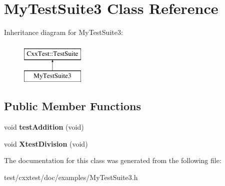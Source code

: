 \hypertarget{classMyTestSuite3}{\section{My\-Test\-Suite3 Class Reference}
\label{classMyTestSuite3}
}
Inheritance diagram for My\-Test\-Suite3\-:\begin{figure}[H]
\begin{center}
\leavevmode
\includegraphics[height=2.000000cm]{classMyTestSuite3}
\end{center}
\end{figure}
\subsection*{Public Member Functions}
\begin{DoxyCompactItemize}
\item 
\hypertarget{classMyTestSuite3_a4090c99d722d07dbd79c3895267669d1}{void {\bfseries test\-Addition} (void)}\label{classMyTestSuite3_a4090c99d722d07dbd79c3895267669d1}

\item 
\hypertarget{classMyTestSuite3_a0954e8a69bcd2aa069be988554eedf89}{void {\bfseries Xtest\-Division} (void)}\label{classMyTestSuite3_a0954e8a69bcd2aa069be988554eedf89}

\end{DoxyCompactItemize}


The documentation for this class was generated from the following file\-:\begin{DoxyCompactItemize}
\item 
test/cxxtest/doc/examples/My\-Test\-Suite3.\-h\end{DoxyCompactItemize}
